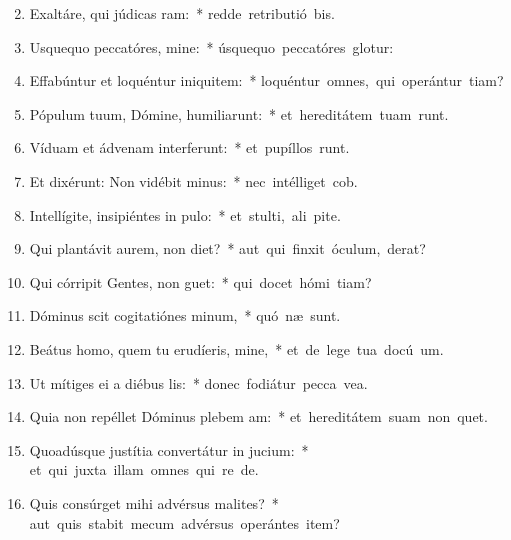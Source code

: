 \begin{flushleft}
\begin{enumerate}[leftmargin=*]
\setcounter{enumi}{1}

\item Exaltáre, qui júdicas ram:~* \mbox{redde retributió bis.}
\item Usquequo peccatóres, mine:~* \mbox{úsquequo peccatóres glotur:}
\item Effabúntur et loquéntur iniquitem:~* \mbox{loquéntur omnes, qui operántur tiam?}
\item Pópulum tuum, Dómine, humiliarunt:~* \mbox{et hereditátem tuam runt.}
\item Víduam et ádvenam interferunt:~* \mbox{et pupíllos runt.}
\item Et dixérunt: Non vidébit minus:~* \mbox{nec intélliget  cob.}
\item Intellígite, insipiéntes in pulo:~* \mbox{et stulti, ali pite.}
\item Qui plantávit aurem, non diet?~* \mbox{aut qui finxit óculum,  derat?}
\item Qui córripit Gentes, non guet:~* \mbox{qui docet hómi tiam?}
\item Dóminus scit cogitatiónes minum,~* \mbox{quó næ sunt.}
\item Beátus homo, quem tu erudíeris, mine,~* \mbox{et de lege tua docú um.}
\item Ut mítiges ei a diébus lis:~* \mbox{donec fodiátur pecca vea.}
\item Quia non repéllet Dóminus plebem am:~* \mbox{et hereditátem suam non quet.}
\item Quoadúsque justítia convertátur in jucium:~* \mbox{et qui juxta illam omnes qui re  de.}
\item Quis consúrget mihi advérsus malites?~* \mbox{aut quis stabit mecum advérsus operántes item?}

\end{enumerate}
\end{flushleft}

